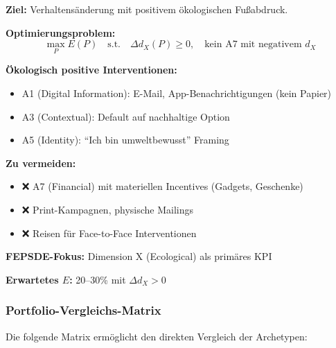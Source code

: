\begin{tcolorbox}[colback=green!10!white, colframe=green!75!black,
    title=\textbf{Archetyp 7: 🌱 Eco-Sustainable Portfolio}]
\textbf{Ziel:} Verhaltensänderung mit positivem ökologischen Fußabdruck.

\textbf{Optimierungsproblem:}
\begin{equation}
\max_{P} E(P) \quad \text{s.t.} \quad \Delta d_X(P) \geq 0, \quad \text{kein A7 mit negativem } d_X
\end{equation}

\textbf{Ökologisch positive Interventionen:}
\begin{itemize}[nosep]
\item A1 (Digital Information): E-Mail, App-Benachrichtigungen (kein Papier)
\item A3 (Contextual): Default auf nachhaltige Option
\item A5 (Identity): ``Ich bin umweltbewusst'' Framing
\end{itemize}

\textbf{Zu vermeiden:}
\begin{itemize}[nosep]
\item ❌ A7 (Financial) mit materiellen Incentives (Gadgets, Geschenke)
\item ❌ Print-Kampagnen, physische Mailings
\item ❌ Reisen für Face-to-Face Interventionen
\end{itemize}

\textbf{FEPSDE-Fokus:} Dimension X (Ecological) als primäres KPI

\textbf{Erwartetes $E$:} 20--30\% mit $\Delta d_X > 0$
\end{tcolorbox}

\subsubsection{Portfolio-Vergleichs-Matrix}

Die folgende Matrix ermöglicht den direkten Vergleich der Archetypen:


